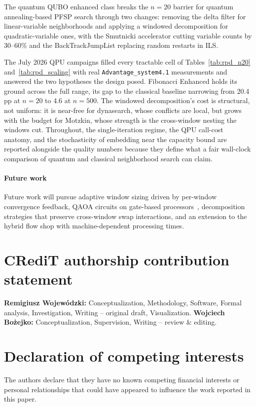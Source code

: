 \documentclass[preprint,12pt,authoryear]{elsarticle}
\begin{document}
The quantum QUBO enhanced class breaks the $n = 20$ barrier for
quantum annealing-based PFSP search through two changes: removing the
delta filter for linear-variable neighborhoods and applying a windowed
decomposition for quadratic-variable ones, with the Smutnicki
accelerator cutting variable counts by 30--60\% and the
BackTrackJumpList replacing random restarts in ILS.

The July 2026 QPU campaigns filled every tractable cell of
Tables~\ref{tab:rpd_n20} and~\ref{tab:rpd_scaling} with real
\texttt{Advantage\_system4.1} measurements and answered the two
hypotheses the design posed. Fibonacci Enhanced holds its ground
across the full range, its gap to the classical baseline narrowing
from 20.4\,pp at $n = 20$ to 4.6 at $n = 500$. The windowed
decomposition's cost is structural, not uniform: it is near-free for
dynasearch, whose conflicts are local, but grows with the budget for
Motzkin, whose strength is the cross-window nesting the windows cut.
Throughout, the single-iteration regime, the QPU call-cost anatomy,
and the stochasticity of embedding near the capacity bound are
reported alongside the quality numbers because they define what a fair
wall-clock comparison of quantum and classical neighborhood search can
claim.

\paragraph{Future work}
Future work will pursue adaptive window sizing driven by per-window
convergence feedback, QAOA circuits on gate-based
processors~\citep{ref_willow}, decomposition strategies that preserve
cross-window swap interactions, and an extension to the hybrid flow
shop with machine-dependent processing times.

\section*{CRediT authorship contribution statement}
\textbf{Remigiusz Wojew\'{o}dzki:} Conceptualization, Methodology,
Software, Formal analysis, Investigation, Writing -- original draft,
Visualization.
\textbf{Wojciech Bo\.{z}ejko:} Conceptualization, Supervision,
Writing -- review \& editing.

\section*{Declaration of competing interests}
The authors declare that they have no known competing financial
interests or personal relationships that could have appeared to
influence the work reported in this paper.
\end{document}
